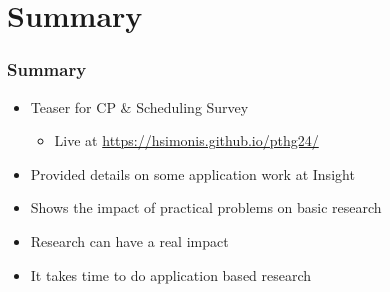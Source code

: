 \section{Summary}

\begin{frame}
\frametitle{Summary}
\begin{itemize}
\item Teaser for CP \& Scheduling Survey
\begin{itemize}
\item Live at \url{https://hsimonis.github.io/pthg24/}
\end{itemize} 
\item Provided details on some application work at Insight
\item Shows the impact of practical problems on basic research
\item Research can have a real impact
\item It takes time to do application based research 
\end{itemize}
\end{frame}

